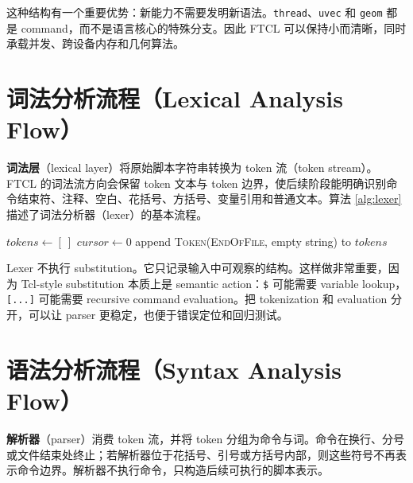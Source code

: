 这种结构有一个重要优势：新能力不需要发明新语法。\texttt{thread}、\texttt{uvec} 和 \texttt{geom} 都是 command，而不是语言核心的特殊分支。因此 FTCL 可以保持小而清晰，同时承载并发、跨设备内存和几何算法。

\section{词法分析流程（Lexical Analysis Flow）}
\textbf{词法层}（lexical layer）将原始脚本字符串转换为 token 流（token stream）。FTCL 的词法流方向会保留 token 文本与 token 边界，使后续阶段能明确识别命令结束符、注释、空白、花括号、方括号、变量引用和普通文本。算法 \ref{alg:lexer} 描述了词法分析器（lexer）的基本流程。

\begin{algorithm}[H]
\caption{FTCL Lexical Analysis}
\label{alg:lexer}
$tokens \leftarrow [\ ]$\;
$cursor \leftarrow 0$\;
append \textsc{Token}(\textsc{EndOfFile}, empty string) to $tokens$\;
\;
\end{algorithm}

Lexer 不执行 substitution。它只记录输入中可观察的结构。这样做非常重要，因为 Tcl-style substitution 本质上是 semantic action：\texttt{\$} 可能需要 variable lookup，\texttt{[...]} 可能需要 recursive command evaluation。把 tokenization 和 evaluation 分开，可以让 parser 更稳定，也便于错误定位和回归测试。

\section{语法分析流程（Syntax Analysis Flow）}
\textbf{解析器}（parser）消费 token 流，并将 token 分组为命令与词。命令在换行、分号或文件结束处终止；若解析器位于花括号、引号或方括号内部，则这些符号不再表示命令边界。解析器不执行命令，只构造后续可执行的脚本表示。

